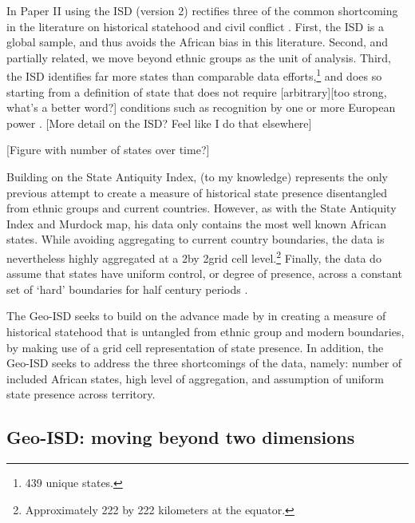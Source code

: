 In Paper II using the ISD (version 2) rectifies three of the common shortcoming
in the literature on historical statehood and civil conflict
\citep{Griffiths2013}. First, the ISD is a global sample, and thus avoids the
African bias in this literature. Second, and partially related, we move beyond
ethnic groups as the unit of analysis. Third, the ISD identifies far more states
than comparable data efforts,\footnote{439 unique states.} and does so starting
from a definition of state that does not require [arbitrary][too strong, what's
a better word?] conditions such as recognition by one or more European power
\citep{Griffiths2013}. [More detail on the ISD? Feel like I do that elsewhere]

[Figure with number of states over time?]

Building on the State Antiquity Index, \citet{Depetris-Chauvin2016} (to my
knowledge) represents the only previous attempt to create a measure of
historical state presence disentangled from ethnic groups and current countries.
However, as with the State Antiquity Index and Murdock map, his data only
contains the most well known African states. While avoiding aggregating to
current country boundaries, the data is nevertheless highly aggregated at a
2\degree  by 2\degree  grid cell level.\footnote{Approximately 222 by 222
kilometers at the equator.} Finally, the data do assume that states have uniform
control, or degree of presence, across a constant set of `hard' boundaries for
half century periods \citep{Depetris-Chauvin2016}. 

The Geo-ISD seeks to build on the advance made by  \citet{Depetris-Chauvin2016}
in creating a measure of historical statehood that is untangled from ethnic
group and modern boundaries, by making use of a grid cell representation of
state presence. In addition, the Geo-ISD seeks to address the three shortcomings
of the data, namely: number of included African states, high level of
aggregation, and assumption of uniform state presence across territory.

\subsection{Geo-ISD: moving beyond two dimensions} 
\label{Geo-ISD}

